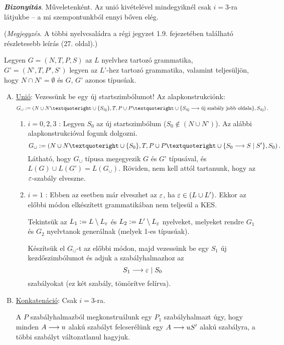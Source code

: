 \begin{mdframed}
	\textbf{\textit{Bizonyítás}}. Műveletenként. Az unió kivételével mindegyiknél csak $i=3$-ra látjukbe -- a mi szempontunkból ennyi bőven elég. 
	
	(\textit{Megjegyzés}. A többi nyelvcsaládra a régi jegyzet 1.9. fejezetében található részletesebb leírás (27. oldal).)
	
	Legyen $G=(N,T,P,S)$ az $L$ nyelvhez tartozó grammatika,
	$G’=(N’,T,P’,S’)$ legyen az $L’$-hez tartozó grammatika, valamint teljesüljön, hogy 
	$N \cap N’ = \emptyset$ és $G$, $G’$ azonos típusúak.
	
	\begin{enumerate}[A)]
		\item \underline{Unió}: Vezessünk be egy új startszimbólumot! Az alapkonstrukciónk:
		\[ G_\cup := \left( N \cup N’ \cup \{S_\text{új}\},T, P \cup P’ \cup \{ \prodrule{S_\text{új}}{\text{új szabály jobb oldala}} \}, S_\text{új} \right). \]
		\begin{enumerate}
			\item $\boxed{i = 0, 2, 3}$ : Legyen $S_0$ az új startszimbólum ($S_0 \notin (N \cup N’)$). Az alábbi alapkonstrukcióval fogunk dolgozni.
			\[ 	G_\cup := \left( N \cup N’ \cup \{S_0\},T, P \cup P’ \cup \{ \prodrule{S_0}{S \mid S'} \}, S_0 \right). \]
			Látható, hogy $G_\cup$ típusa megegyezik $G$ és $G’$ típusával, és $L(G) \cup L(G’) = L(G_\cup)$. Röviden, nem kell attól tartanunk, hogy az $\varepsilon$-szabály elveszne.
			\item $\boxed{i = 1}$ : Ebben az esetben már elveszhet az $\varepsilon$, ha $\varepsilon \in (L \cup L')$. Ekkor az előbbi módon elkészített grammatikában nem teljesül a KES.
			
			Tekintsük az $L_1 := L \setminus L_\varepsilon$ és $L_2 := L' \setminus L_\varepsilon$ nyelveket, melyeket rendre $G_1$ és $G_2$ nyelvtanok generálnak (melyek 1-es típusúak).
			
			Készítsük el $G_\cup$-t az előbbi módon, majd vezessünk be egy $S_1$
			új kezdőszimbólumot és adjuk a szabályhalmazhoz az
			\[ S_1 \longrightarrow \varepsilon \mid S_0 \]
			szabályokat (ez két szabály, tömörítve felírva).
		\end{enumerate}
		
		\newpage
		
		\item \underline{Konkatenáció}: Csak $i=3$-ra.
		
		A $P$ szabályhalmazból megkonstruálunk egy $P_1$
		szabályhalmazt úgy, hogy minden $A \longrightarrow u$ alakú
		szabályt felcserélünk egy $A \longrightarrow uS'$ alakú szabályra, a
		többi szabályt változatlanul hagyjuk.
		

\end{enumerate}
\end{mdframed}
